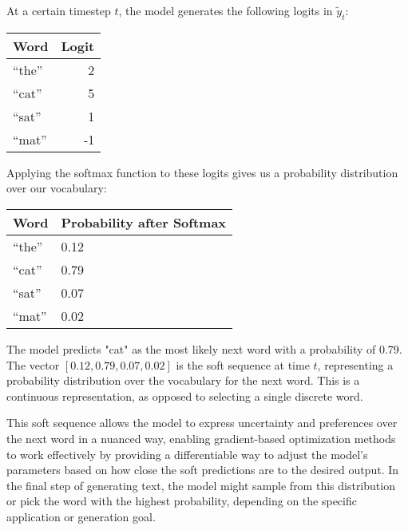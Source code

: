 \documentclass{article}
\newcommand{\quotes}[1]{``#1''}
\begin{document}
At a certain timestep \(t\), the model generates the following logits in \(\tilde{y}_t\):

\begin{center}
    \begin{tabular}{l r}
        \textbf{Word} & \textbf{Logit} \\
        \hline
        \quotes{the}  & 2              \\
        \quotes{cat}  & 5              \\
        \quotes{sat}  & 1              \\
        \quotes{mat}  & -1             \\
    \end{tabular}
\end{center}

Applying the softmax function to these logits gives us a probability distribution over our vocabulary:

\begin{center}
    \begin{tabular}{l p{2.5cm}} %
        \textbf{Word} & \textbf{Probability after Softmax} \\
        \hline
        \quotes{the}  & 0.12                               \\
        \quotes{cat}  & 0.79                               \\
        \quotes{sat}  & 0.07                               \\
        \quotes{mat}  & 0.02                               \\
    \end{tabular}
\end{center}



The model predicts "cat" as the most likely next word with a probability of 0.79. The vector \([0.12, 0.79, 0.07, 0.02]\) is the soft sequence at time \(t\), representing a probability distribution over the vocabulary for the next word. This is a continuous representation, as opposed to selecting a single discrete word.

This soft sequence allows the model to express uncertainty and preferences over the next word in a nuanced way, enabling gradient-based optimization methods to work effectively by providing a differentiable way to adjust the model's parameters based on how close the soft predictions are to the desired output. In the final step of generating text, the model might sample from this distribution or pick the word with the highest probability, depending on the specific application or generation goal.
\end{document}
